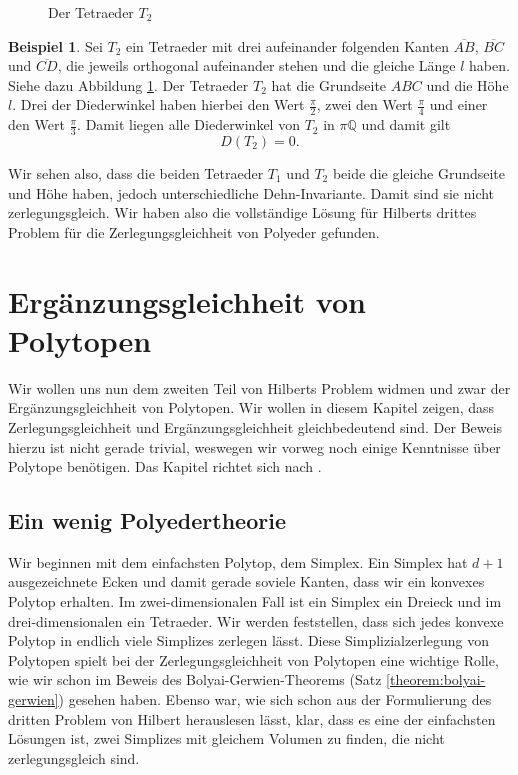\documentclass[11pt,titlepage]{article}
\newcommand{\setQ}{\mathbb{Q}}
\theoremstyle{definition}
\newtheorem{example}[theorem]{Beispiel}
\theoremstyle{remark}
\begin{document}
\begin{figure}[!htbp]
\begin{minipage}[m]{0.4\textwidth}
			\caption{Der Tetraeder $T_2$}
			\label{Abb.6}
		\end{minipage}
	\end{figure}

	\begin{example}
		Sei $T_2$ ein Tetraeder mit drei aufeinander folgenden Kanten 
		$\overline{AB}$, $\overline{BC}$ und $\overline{CD}$, die jeweils 
		orthogonal aufeinander stehen und die gleiche Länge $l$ haben. 
		Siehe dazu Abbildung \ref{Abb.6}. 
		Der Tetraeder $T_2$ hat die Grundseite $ABC$ und die Höhe $l$. 
		Drei der Diederwinkel haben hierbei den Wert $\frac{\pi}{2}$, 
		zwei den Wert $\frac{\pi}{4}$ und einer den Wert $\frac{\pi}{3}$. 
		Damit liegen alle Diederwinkel von $T_2$ in $\pi\setQ$ und damit 
		gilt 
		\[D(T_2)=0.\]
	\end{example}
	
	Wir sehen also, dass die beiden Tetraeder $T_1$ und $T_2$ beide die 
	gleiche Grundseite und Höhe haben, jedoch unterschiedliche Dehn-Invariante. 
	Damit sind sie nicht zerlegungsgleich. Wir haben also die vollständige 
	Lösung für Hilberts drittes Problem für die Zerlegungsgleichheit von 
	Polyeder gefunden.
	
	\newpage
	
	\section{Ergänzungsgleichheit von Polytopen}
	
	Wir wollen uns nun dem zweiten Teil von Hilberts Problem widmen und zwar der 
	Ergänzungsgleichheit von Polytopen. Wir wollen in diesem Kapitel zeigen, dass 
	Zerlegungsgleichheit und Ergänzungsgleichheit gleichbedeutend sind. Der 
	Beweis hierzu ist nicht gerade trivial, weswegen wir vorweg noch einige 
	Kenntnisse über Polytope benötigen. Das Kapitel richtet sich nach 
	\cite{Hadwiger}. 
	
	\subsection{Ein wenig Polyedertheorie}
	
	Wir beginnen mit dem einfachsten Polytop, dem Simplex. Ein Simplex hat 
	$d+1$ ausgezeichnete Ecken und damit gerade soviele Kanten, dass 
	wir ein konvexes Polytop erhalten. Im zwei-dimensionalen Fall ist ein 
	Simplex ein Dreieck und im drei-dimensionalen ein Tetraeder. Wir werden 
	feststellen, dass sich jedes konvexe Polytop in endlich viele Simplizes 
	zerlegen lässt. Diese Simplizialzerlegung von Polytopen spielt bei 
	der Zerlegungsgleichheit von Polytopen eine wichtige Rolle, wie wir schon im 
	Beweis des Bolyai-Gerwien-Theorems (Satz \ref{theorem:bolyai-gerwien}) 
	gesehen haben. Ebenso war, wie sich schon aus der Formulierung des dritten Problem von Hilbert herauslesen lässt, klar, dass es eine der einfachsten Lösungen ist, zwei Simplizes mit gleichem Volumen zu finden, die nicht zerlegungsgleich sind.
	
\end{document}
